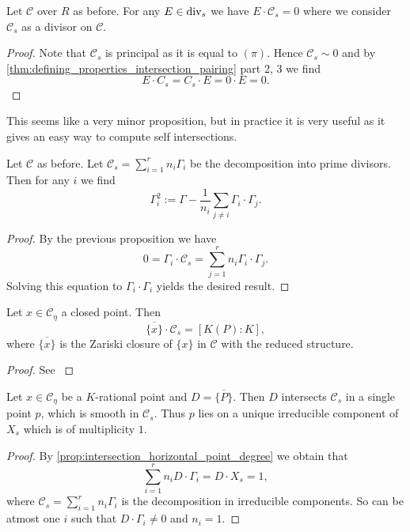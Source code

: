\begin{proposition}
	Let $\mathscr C$ over $R$ as before. 
	For any $E \in \operatorname{div}_s$ we have $E\cdot \mathscr C_s = 0$ where we consider $\mathscr C_s$ as a divisor on $\mathscr C$. 
\end{proposition}
\begin{proof}
	Note that $\mathscr C_s$ is principal as it is equal to $(\pi)$. 
	Hence $\mathscr C_s \sim 0$ and by \cref{thm:defining_properties_intersection_pairing} part 2, 3 we find \[
	E\cdot C_s = C_s \cdot E = 0 \cdot E = 0
	.\] 
\end{proof}
This seems like a very minor proposition, but in practice it is very useful as it gives an easy way to compute self intersections. 
\begin{corollary}
	Let $\mathscr C$ as before. 
	Let $\mathscr C_s = \sum_{i =1}^{r} n_i \Gamma_i$ be the decomposition into prime divisors. 
	Then for any $i$ we find \[
		\Gamma^2_i := \Gamma -\frac{1}{n_i} \sum_{j \ne i} \Gamma_i \cdot \Gamma_j
	.\] 
\end{corollary}
\begin{proof}
	By the previous proposition we have \[
	 0 = \Gamma_i \cdot \mathscr C_s = \sum_{j = 1}^{r} n_i \Gamma_i \cdot \Gamma_j
	.\] 
	Solving this equation to $\Gamma_i\cdot \Gamma_i$ yields the desired result. 
\end{proof}

\begin{proposition}\label{prop:intersection_horizontal_point_degree}
	Let $x \in \mathscr C_\eta$ a closed point. 
	Then \[
		\overline{\{x\} }\cdot \mathscr C_s = [K(P): K]
	,\] 
	where $\overline{\{x\} }$ is the Zariski closure of $\{x\} $ in $\mathscr C$ with the reduced structure. 
\end{proposition}
\begin{proof}
	See \cite[prop.\ 9.1.30]{liuAlgebraicGeometryArithmetic2002}
\end{proof}


\begin{corollary}
	Let $x \in \mathscr C_\eta$ be a $K$-rational point and $D = \overline{\{P\} } $. 
	Then $D$ intersects $\mathscr C_s$ in a single point $p$, which is smooth in $\mathscr C_s$. 
	Thus $p$ lies on a unique irreducible component of $X_s$ which is of multiplicity $1$. 
\end{corollary}
\begin{proof}
	By \cref{prop:intersection_horizontal_point_degree} we obtain that \[
	\sum_{i = 1}^{r}  n_i D\cdot \Gamma_i = D \cdot X_s = 1
	,\] 
	where $\mathscr C_s = \sum_{i =1}^{r} n_i \Gamma_i$ is the decomposition in irreducible components. 
	So can be atmost one $i$ such that $D\cdot \Gamma_i \ne  0$ and $n_i = 1$. 
\end{proof}

